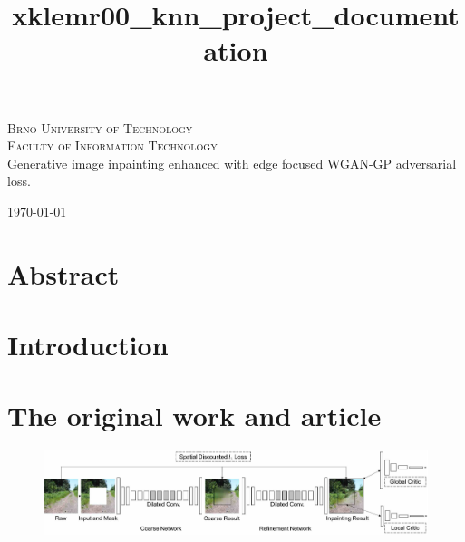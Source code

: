 \documentclass[a4paper, 11pt]{article}
\title{xklemr00\_knn\_project\_documentation}
\begin{document}
    \begin{titlepage}
 \begin{center}
  {\Huge\textsc{Brno University of Technology\\[0.3em]
    \huge{Faculty of Information Technology}}}\\
  {\Huge
  Generative image inpainting enhanced with edge focused WGAN-GP adversarial loss.}
 \end{center}
 {\Large 
 \today 
 \hfill
}
\end{titlepage}

\newpage
\section{Abstract}
\label{section:abstract}

\section{Introduction}
\label{section:introduction}

\section{The original work and article}
\label{section:origin}
    \begin{figure}
        \centering
        \includegraphics[width=0.75\linewidth]{documentation/img/original_arch.png}
    \end{figure}
\end{document}
